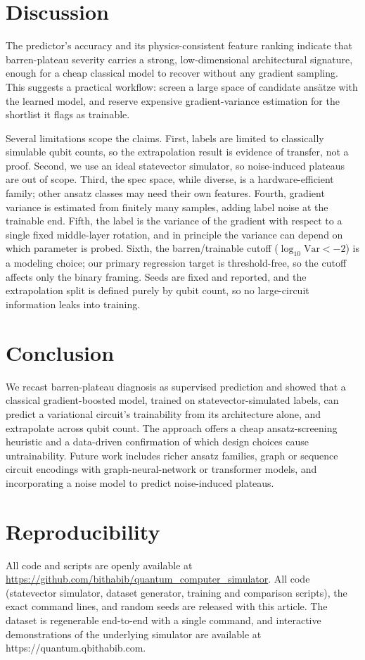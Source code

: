\documentclass{ieeeaccess}
\begin{document}
\section{Discussion}
The predictor's accuracy and its physics-consistent feature ranking indicate that
barren-plateau severity carries a strong, low-dimensional architectural signature,
enough for a cheap classical model to recover without any gradient sampling. This
suggests a practical workflow: screen a large space of candidate ans\"atze with the
learned model, and reserve expensive gradient-variance estimation for the shortlist
it flags as trainable.

Several limitations scope the claims. First, labels are limited to classically
simulable qubit counts, so the extrapolation result is evidence of transfer, not a
proof. Second, we use an ideal statevector simulator, so noise-induced plateaus
\cite{wang2021noise} are out of scope. Third, the spec space, while diverse, is a
hardware-efficient family; other ansatz classes may need their own features. Fourth,
gradient variance is estimated from finitely many samples, adding label noise at the
trainable end. Fifth, the label is the variance of the gradient with respect to a
single fixed middle-layer rotation, and in principle the variance can depend on
which parameter is probed. Sixth, the barren/trainable cutoff
($\log_{10}\mathrm{Var}<-2$) is a modeling choice; our primary regression target is
threshold-free, so the cutoff affects only the binary framing. Seeds are fixed and
reported, and the extrapolation split is defined purely by qubit count, so no
large-circuit information leaks into training.

\section{Conclusion}
We recast barren-plateau diagnosis as supervised prediction and showed that a
classical gradient-boosted model, trained on statevector-simulated labels, can
predict a variational circuit's trainability from its architecture alone, and
extrapolate across qubit count. The approach offers a cheap ansatz-screening
heuristic and a data-driven confirmation of which design choices cause
untrainability. Future work includes richer ansatz families, graph or sequence
circuit encodings with graph-neural-network or transformer models, and
incorporating a noise model to predict noise-induced plateaus.

\section*{Reproducibility}
All code and scripts are openly available at
\url{https://github.com/bithabib/quantum_computer_simulator}.
All code (statevector simulator, dataset generator, training and comparison
scripts), the exact command lines, and random seeds are released with this article.
The dataset is regenerable end-to-end with a single command, and interactive
demonstrations of the underlying simulator are available at
https://quantum.qbithabib.com.




\EOD
\end{document}
